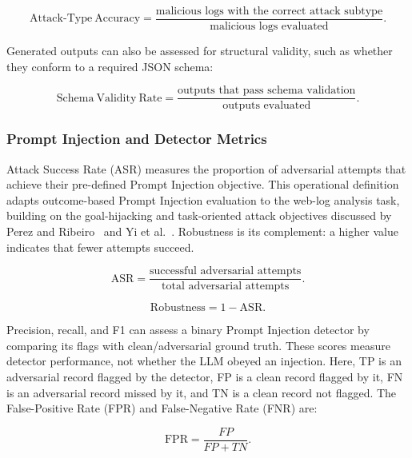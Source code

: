 \begin{equation}
\mathrm{Attack\text{-}Type\ Accuracy} =
\frac{\text{malicious logs with the correct attack subtype}}
{\text{malicious logs evaluated}}.
\end{equation}

Generated outputs can also be assessed for structural validity, such as
whether they conform to a required JSON schema:

\begin{equation}
\mathrm{Schema\ Validity\ Rate} =
\frac{\text{outputs that pass schema validation}}
{\text{outputs evaluated}}.
\end{equation}

\subsubsection{Prompt Injection and Detector Metrics}

Attack Success Rate (ASR) measures the proportion of adversarial attempts
that achieve their pre-defined Prompt Injection objective. This operational
definition adapts outcome-based Prompt Injection evaluation to the
web-log analysis task, building on the goal-hijacking and task-oriented
attack objectives discussed by Perez and Ribeiro~\cite{perez2022ignore}
and Yi et al.~\cite{yi2025bipia}.
Robustness is
its complement: a higher value indicates that fewer attempts succeed.

\begin{equation}
\mathrm{ASR} =
\frac{\text{successful adversarial attempts}}
{\text{total adversarial attempts}}.
\end{equation}

\begin{equation}
\mathrm{Robustness} = 1 - \mathrm{ASR}.
\end{equation}

Precision, recall, and F1 can assess a binary Prompt Injection detector
by comparing its flags with clean/adversarial ground truth. These scores
measure detector performance, not whether the LLM obeyed an injection.
Here, TP is an adversarial record flagged by the detector, FP is a clean
record flagged by it, FN is an adversarial record missed by it, and TN is
a clean record not flagged. The False-Positive Rate (FPR) and
False-Negative Rate (FNR) are:

\begin{equation}
\mathrm{FPR} = \frac{FP}{FP+TN}.
\end{equation}

